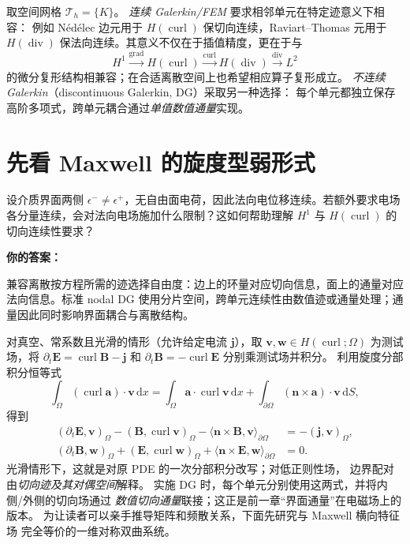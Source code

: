 \documentclass[UTF8,11pt,openany]{ctexbook}
\numberwithin{equation}{chapter}
\theoremstyle{definition}
\theoremstyle{remark}
\newcommand{\dd}{\mathrm d}
\newcommand{\grad}{\operatorname{grad}}
\newcommand{\Div}{\operatorname{div}}
\newcommand{\curl}{\operatorname{curl}}
\begin{document}
取空间网格 $\mathcal T_h=\{K\}$。
\emph{连续 Galerkin/FEM} 要求相邻单元在特定迹意义下相容：
例如 N\'ed\'elec 边元用于 $H(\curl)$ 保切向连续，Raviart--Thomas 元用于
$H(\Div)$ 保法向连续。其意义不仅在于插值精度，更在于与
\begin{equation}\label{eq:derhamfem}
H^1\xrightarrow{\grad}H(\curl)
\xrightarrow{\curl}H(\Div)\xrightarrow{\Div}L^2
\end{equation}
的微分复形结构相兼容；在合适离散空间上也希望相应算子复形成立。
\emph{不连续 Galerkin}（discontinuous Galerkin, DG）采取另一种选择：
每个单元都独立保存高阶多项式，跨单元耦合通过\emph{单值数值通量}实现。

\section{先看 Maxwell 的旋度型弱形式}\label{sec:maxwellweak}
\begin{studentinput}
设介质界面两侧 $\epsilon^-\ne\epsilon^+$，无自由面电荷，因此法向电位移连续。若额外要求电场各分量连续，会对法向电场施加什么限制？这如何帮助理解 $H^1$ 与 $H(\curl)$ 的切向连续性要求？

\textbf{你的答案：}\vspace{2cm}
\end{studentinput}

\begin{engineernote}
兼容离散按方程所需的迹选择自由度：边上的环量对应切向信息，面上的通量对应法向信息。标准 nodal DG 使用分片空间，跨单元连续性由数值迹或通量处理；通量因此同时影响界面耦合与离散结构。
\end{engineernote}
对真空、常系数且光滑的情形（允许给定电流 $\bm j$），取
$\bm v,\bm w\in H(\curl;\Omega)$ 为测试场，将
$\partial_t\bm E=\curl\bm B-\bm j$ 和
$\partial_t\bm B=-\curl\bm E$ 分别乘测试场并积分。
利用旋度分部积分恒等式
\begin{equation}
\int_\Omega(\curl\bm a)\cdot\bm v\,\dd x
=\int_\Omega\bm a\cdot\curl\bm v\,\dd x
+\int_{\partial\Omega}(\bm n\times\bm a)\cdot\bm v\,\dd S,
\end{equation}
得到
\begin{align}\label{eq:maxwellweakcurl}
(\partial_t\bm E,\bm v)_\Omega
-(\bm B,\curl\bm v)_\Omega
-\langle\bm n\times\bm B,\bm v\rangle_{\partial\Omega}
&=-(\bm j,\bm v)_\Omega,\\
(\partial_t\bm B,\bm w)_\Omega
+(\bm E,\curl\bm w)_\Omega
+\langle\bm n\times\bm E,\bm w\rangle_{\partial\Omega}
&=0.
\end{align}
光滑情形下，这就是对原 PDE 的一次分部积分改写；对低正则性场，
边界配对由\emph{切向迹及其对偶空间}解释。
实施 DG 时，每个单元分别使用这两式，并将内侧/外侧的切向场通过
\emph{数值切向通量}联接；这正是前一章“界面通量”在电磁场上的版本。
为让读者可以亲手推导矩阵和频散关系，下面先研究与 Maxwell 横向特征场
完全等价的一维对称双曲系统。
\end{document}

